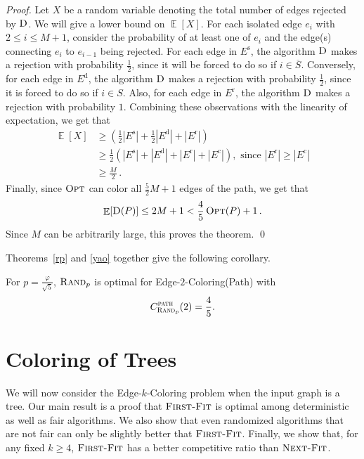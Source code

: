 \documentclass[smallextended]{svjour3}
\def\mck{{\sc Edge-$k$-Coloring}\xspace}
\def\mcpath{{\sc Edge-$2$-Coloring(Path)}\xspace}
\newcommand{\NF}{\ensuremath{\operatorname{\textsc{Next-Fit}}}\xspace}
\newcommand{\FF}{\ensuremath{\operatorname{\textsc{First-Fit}}}\xspace}
\newcommand{\OPT}{\ensuremath{\operatorname{\textsc{Opt}}}\xspace}
\newcommand{\RP}{\ensuremath{\operatorname{\textsc{Rand}}}\xspace}
\newcommand{\algo}[1]{\ensuremath{\operatorname{\textsc{#1}}}\xspace}
\newcommand{\ab}[1] {\left\vert #1\right\vert}
\DeclareMathOperator{\E}{\mathbb{E}}
\newcommand{\eis}{\ensuremath{E^{\text{s}}}\xspace}
\newcommand{\eid}{\ensuremath{E^{\text{d}}}\xspace}
\newcommand{\eir}{\ensuremath{E^{\text{r}}}\xspace}
\newcommand{\eic}{\ensuremath{E^{\text{c}}}\xspace}
\begin{document}
\begin{proof}
Let $X$ be a random variable denoting the total number of edges rejected by $\algo{D}$. We will give a lower bound on $\E[X]$.
For each isolated edge $e_i$ with $2 \leq i
\leq M+1$, consider the probability of at least one of $e_i$ and the edge(s)
connecting $e_i$ to $e_{i-1}$ being rejected. For each edge in
$\eis$, the algorithm $\algo{D}$ makes a rejection with probability
$\frac{1}{2}$, since it will be forced to do so if
$i\in \overline{S}$. Conversely, for each edge in $\eid$, the algorithm $\algo{D}$
makes a rejection with probability $\frac{1}{2}$, since it is forced to
do so if $i\in{S}$. Also, for each edge in $\eir$, the algorithm
$\algo{D}$ makes a rejection with probability $1$. Combining these observations with the linearity of expectation, we get that
\begin{align*}
\E[X]&\geq \left(\frac{1}{2}\ab{\eis} + \frac{1}{2}\ab{\eid} + \ab{\eir}\right) \\
&\geq \frac{1}{2}\left(\ab{\eis} + \ab{\eid} + \ab{\eir} + \ab{\eic}\right),
      \text{ since } |\eir| \geq |\eic|\\
&\geq \frac{M}{2}\,.
\end{align*}
Finally, since \OPT can color all $\frac{5}{2}M+1$ edges of the path, we get that 
 $$\E[\algo{D}(P)]\leq 2M+1 < \frac45 \OPT (P) + 1\,.$$
Since $M$ can be arbitrarily large, this proves the theorem.
\qed\end{proof}

Theorems~\ref{rp} and \ref{yao} together give the following corollary.

\begin{corollary}
For $p=\frac{\varphi}{\sqrt{5}}$, $\RP_p$ is optimal for \mcpath with\vspace{-1mm}
\begin{displaymath}
C_{\RP_{p}}^{\text{\sc path}}(2)=\frac45.
\end{displaymath}
\end{corollary}


\section{Coloring of Trees}
We will now consider the \mck problem when the input graph is a tree. 
Our main result is a proof that \FF is optimal among deterministic
 as well as fair algorithms. 
We also show that even randomized algorithms that are not fair can
only be slightly better that \FF.
Finally, we show that, for any fixed $k\geq 4$, \FF has a 
 better competitive ratio than \NF.
\end{document}
